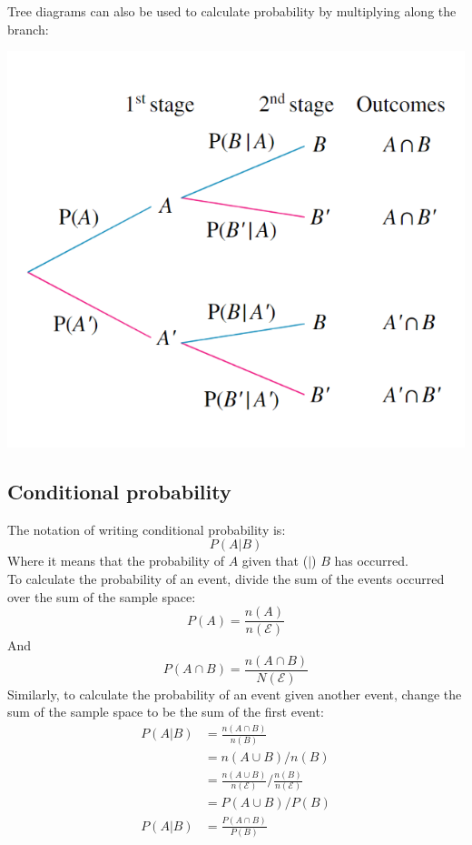 \documentclass{report}
\begin{document}
Tree diagrams can also be used to calculate probability by multiplying along the branch:
\begin{center}
	\includegraphics[scale=0.5]{tree diagrams probability}
\end{center}

\subsection{Conditional probability}
The notation of writing conditional probability is:
$$
	P(A|B)
$$
Where it means that the probability of $A$ given that ($|$) $B$ has occurred.\\

To calculate the probability of an event, divide the sum of the events occurred over the sum of the sample space:
$$
	P(A) = \frac{n(A)}{n(\mathcal{E})}
$$
And
$$
	P(A \cap B) = \frac{n(A \cap B)}{N(\mathcal{E})}
$$
Similarly, to calculate the probability of an event given another event, change the sum of the sample space to be the sum of the first event:
\begin{align*}
	P(A|B) & = \frac{n(A \cap B)}{n(B)}                                         \\
	       & = n(A \cup B) / n(B)                                               \\
	       & = \frac{n(A \cup B)}{n(\mathcal{E})} / \frac{n(B)}{n(\mathcal{E})} \\
	       & = P(A \cup B) / P(B)                                               \\
	P(A|B) & = \frac{P(A \cap B)}{P(B)}
\end{align*}
\end{document}
